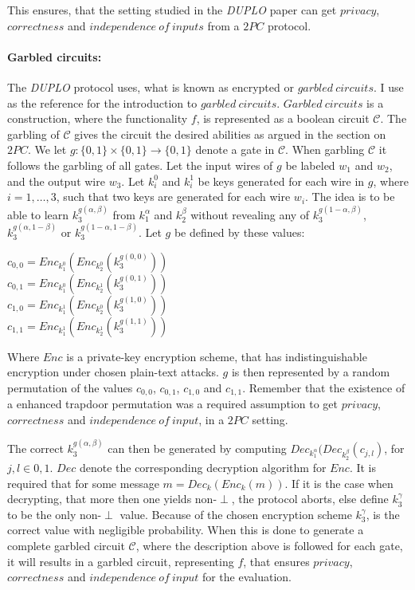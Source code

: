 \documentclass[twoside,11pt,openright]{report}
\newcommand{\DUPLO}{\textit{DUPLO} }
\begin{document}
This ensures, that the setting studied in the \DUPLO paper can get $privacy$, $correctness$ and $independence~of~inputs$ from a $2PC$ protocol.

\paragraph{Garbled circuits:} 
The \DUPLO protocol uses, what is known as encrypted or $garbled~circuits$. I use \cite{estpp} as the reference for the introduction to $garbled~circuits$. $Garbled~circuits$ is a construction, where the functionality $f$, is represented as a boolean circuit $\mathcal{C}$. The garbling of $\mathcal{C}$ gives the circuit the desired abilities as argued in the section on $2PC$. We let $g:\{0,1\}\times \{0,1\} \to \{0,1\}$ denote a gate in $\mathcal{C}$. When garbling $\mathcal{C}$ it follows the garbling of all gates. Let the input wires of $g$ be labeled $w_1$ and $w_2$, and the output wire $w_3$. Let $k^0_i$ and $k^1_i$ be keys generated for each wire in $g$, where $i=1,\dots,3$, such that two keys are generated for each wire $w_i$. The idea is to be able to learn $k^{g(\alpha,\beta)}_3$ from $k^\alpha_1$ and $k^\beta_2$ without revealing any of $k^{g(1-\alpha,\beta)}_3$, $k^{g(\alpha,1-\beta)}_3$ or $k^{g(1-\alpha,1-\beta)}_3$. Let $g$ be defined by these values:

\begin{center}
    $c_{0,0} = Enc_{k^0_1}(Enc_{k^0_2}(k^{g(0,0)}_3))$    \\
    $c_{0,1} = Enc_{k^0_1}(Enc_{k^1_2}(k^{g(0,1)}_3))$    \\
    $c_{1,0} = Enc_{k^1_1}(Enc_{k^0_2}(k^{g(1,0)}_3))$    \\
    $c_{1,1} = Enc_{k^1_1}(Enc_{k^1_2}(k^{g(1,1)}_3))$    \\
\end{center}

Where $Enc$ is a private-key encryption scheme, that has indistinguishable encryption under chosen plain-text attacks. $g$ is then represented by a random permutation of the values $c_{0,0}$, $c_{0,1}$, $c_{1,0}$ and $c_{1,1}$. Remember that the existence of a enhanced trapdoor permutation was a required assumption to get $privacy$, $correctness$ and $independence~of~input$, in a $2PC$ setting.

The correct $k^{g(\alpha,\beta)}_3$ can then be generated by computing $Dec_{k^\alpha_1}(Dec_{k^\beta_2}(c_{j,l})$, for $j,l\in{0,1}$. $Dec$ denote the corresponding decryption algorithm for $Enc$. It is required that for some message $m=Dec_k(Enc_k(m))$. If it is the case when decrypting, that more then one yields non-$\perp$, the protocol aborts, else define $k^\gamma_3$ to be the only non-$\perp$ value. Because of the chosen encryption scheme $k^\gamma_3$, is the correct value with negligible probability. When this is done to generate a complete garbled circuit $\mathcal{C}$, where the description above is followed for each gate, it will results in a garbled circuit, representing $f$, that ensures $privacy$, $correctness$ and $independence ~of~input$ for the evaluation.
\end{document}
